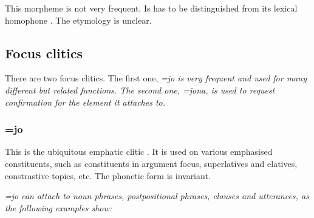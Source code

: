 This morpheme is not very frequent. Is has to be distinguished from its lexical homophone . The etymology is unclear.

\subsection{Focus clitics}\label{sec:morph:Focusclitics}
There are two focus clitics. The first one, \em =jo \em is very frequent and used for many different but related functions. The second one, \em =jona\em, is used to request confirmation for the element it attaches to.

\subsubsection{=jo}\label{sec:morph:=jo}
This  is the ubiquitous emphatic clitic \citep[cf.][143]{Bakker2006}. It is used on various emphasised constituents, such as constituents in argument focus, superlatives and elatives, constrastive topics, etc. The phonetic form is invariant.

\em =jo \em can attach to noun phrases, postpositional phrases, clauses and utterances, as the following examples show:

\\ 

\\


 \\

\\ 

